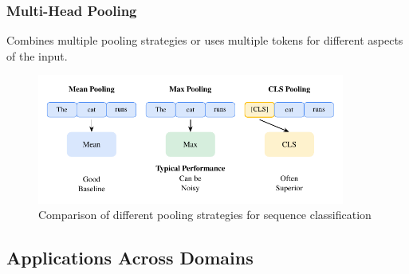 \subsubsection{Multi-Head Pooling}
Combines multiple pooling strategies or uses multiple \cls{} tokens for different aspects of the input.

\begin{figure}[h]
\centering
\includegraphics[width=0.9\textwidth]{part1/chapter02/fig_pooling_comparison.pdf}
\caption{Comparison of different pooling strategies for sequence classification}

\end{figure}

\subsection{Applications Across Domains}

